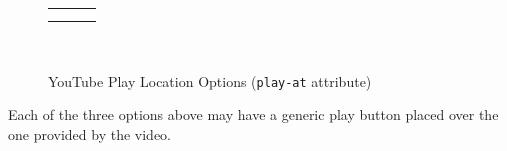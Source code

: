 \documentclass[10pt,]{article}
\theoremstyle{plain}
\theoremstyle{definition}
\theoremstyle{definition}
\theoremstyle{definition}
\theoremstyle{definition}
\theoremstyle{definition}
\theoremstyle{definition}
\numberwithin{equation}{section}
\newlength{\panelmax}
\begin{document}
\begin{figure}
{\begin{tabular}{@{}*{3}{c}@{}}
\begin{minipage}[c][\panelmax][t]{0.3\linewidth}\usebox{\panelboxAvideo}\end{minipage}&
\begin{minipage}[c][\panelmax][t]{0.3\linewidth}\usebox{\panelboxBvideo}\end{minipage}&
\begin{minipage}[c][\panelmax][t]{0.3\linewidth}\usebox{\panelboxCvideo}\end{minipage}\tabularnewline
\parbox[t]{0.3\linewidth}{
}&
\parbox[t]{0.3\linewidth}{
}&
\parbox[t]{0.3\linewidth}{
}\end{tabular}\\
}%
\caption{YouTube Play Location Options (\lstinline?play-at? attribute)\label{figure-32}}
\end{figure}
\hypertarget{p-502}{}%
Each of the three options above may have a generic play button placed over the one provided by the video.%
\end{document}
